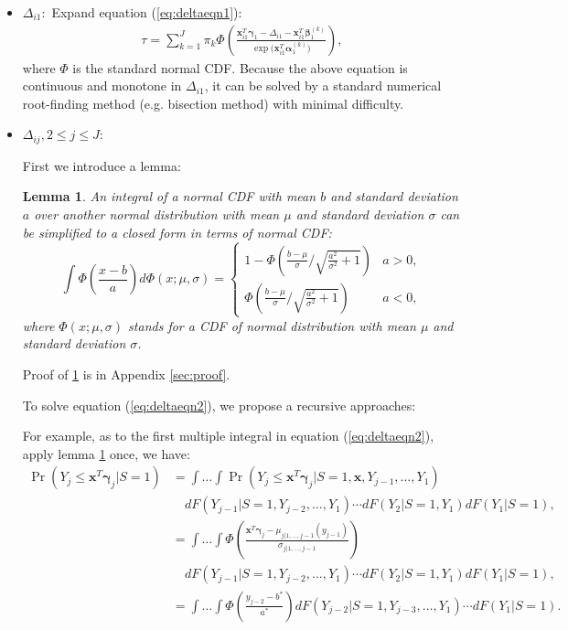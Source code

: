 \documentclass[12pt]{article}
\newtheorem{lem}[thm]{Lemma}
\DeclareMathOperator{\prob}{Pr}
\begin{document}
\begin{itemize}
\item \textbf{$\Delta_{i1}: $} Expand equation (\ref{eq:deltaeqn1}):
  \begin{align*}
    \tau = \sum_{k = 1}^J \pi_k \Phi \left( \frac{\bm x_{i1}^T \bm
        \gamma_1 - \Delta_{i1} - \bm x_{i1}^T\bm \beta_1^{(k)}}{\exp
        \big( \bm x_{i1}^T \bm \alpha_1^{(k)} \big)} \right),
  \end{align*}
  where $\Phi$ is the standard normal CDF. Because the above equation
  is continuous and monotone in $\Delta_{i1}$, it can be solved by a
  standard numerical root-finding method (e.g. bisection method) with
  minimal difficulty.

\item \textbf{$\Delta_{ij}, 2\leq j \leq J: $}

  First we introduce a lemma:
  \begin{lem}\label{sec:lemma}
    An integral of a normal CDF with mean $b$ and standard deviation
    $a$ over another normal distribution with mean $\mu$ and standard
    deviation $\sigma$ can be simplified to a closed form in terms of
    normal CDF:
    \begin{equation}
      \label{eq:lem}
      \int \Phi \left( \frac{x-b}{a} \right) d\Phi(x; \mu, \sigma)  =
      \begin{cases}
        1- \Phi \left( \frac{b-\mu}{\sigma} \big / \sqrt{\frac{a^2}{\sigma^2}+1} \right) & a > 0, \\
        \Phi \left( \frac{b-\mu}{\sigma} \big /
          \sqrt{\frac{a^2}{\sigma^2}+1} \right) & a < 0 ,
      \end{cases}
    \end{equation}
    where $\Phi(x; \mu, \sigma)$ stands for a CDF of normal
    distribution with mean $\mu$ and standard deviation $\sigma$.
  \end{lem}
  Proof of \ref{sec:lemma} is in Appendix \ref{sec:proof}.

  To solve equation (\ref{eq:deltaeqn2}), we propose a recursive
  approaches:

  For example, as to the first multiple integral in equation
  (\ref{eq:deltaeqn2}), apply lemma \ref{sec:lemma} once, we have:
  \begin{align*}
    \prob (Y_j \leq \bm x^T \bm \gamma_j | S = 1) & = \int\dots\int
    \prob (Y_j \leq \bm x^T\bm \gamma_j | S=1, \bm x, Y_{j-1}, \ldots, Y_1)\\
    & \quad  dF(Y_{j-1}|S=1, Y_{j-2}, \ldots, Y_1) \cdots dF(Y_2|S=1, Y_1) d F (Y_1 | S = 1), \\
    & = \int\dots\int
    \Phi \left( \frac{\bm x^T \bm \gamma_j - \mu_{j|1, \ldots, j-1}(y_{j-1})}{\sigma_{j|1, \ldots, j-1}} \right) \\
    & \quad dF(Y_{j-1}|S=1, Y_{j-2}, \ldots, Y_1) \cdots dF(Y_2|S=1, Y_1) d F (Y_1 | S = 1), \\
    & = \int\dots\int \Phi \left( \frac{y_{j-2} - b^{*}}{a^{*}}
    \right) dF(Y_{j-2}|S=1, Y_{j-3}, \ldots, Y_1) \cdots d F (Y_1 | S
    = 1).
  \end{align*}


\end{itemize}
\end{document}
